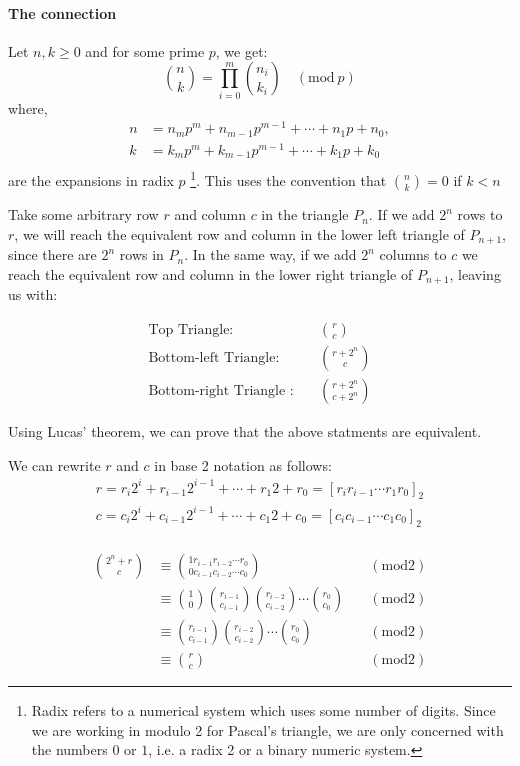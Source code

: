 \documentclass[a4paper,11pt,twoside]{article}
\begin{document}
\paragraph{The connection}
\label{sec:org6facba4}
Let \(n,k \ge 0\) and for some prime \(p\), we get:
\begin{equation}
\binom{n}{k} = \prod_{i=0}^{m} \binom{n_i}{k_i} \quad (\text{mod}~p)
\end{equation}
where,
\begin{align*}
n &= n_{m}p^{m}+n_{m-1}p^{m-1}+\cdots + n_{1}p+n_{0},\\
k &= k_{m}p^{m}+k_{m-1}p^{m-1}+\cdots + k_{1}p+k_{0}\\
\end{align*}
are the expansions in radix \(p\) \footnote{Radix refers to a numerical system which uses some number of digits. Since we are working in modulo 2 for Pascal's triangle, we are only concerned with the numbers \(0\) or \(1\), i.e. a radix 2 or a binary numeric system.}. This uses the convention that \(\binom{n}{k} = 0\) if \(k < n\)

Take some arbitrary row \(r\) and column \(c\) in the triangle \(P_{n}\). If we add \(2^{n}\) rows to \(r\), we will reach the equivalent row and column in the lower left triangle of \(P_{n+1}\), since there are \(2^{n}\) rows in \(P_{n}\). In the same way, if we add \(2^{n}\) columns to \(c\) we reach the equivalent row and column in the lower right triangle of \(P_{n+1}\), leaving us with:

\begin{align*}
\text{Top Triangle:} \quad &\binom{r}{c}  \\
\text{Bottom-left Triangle:}\quad &\binom{r + 2^n}{c}  \\
\text{Bottom-right Triangle :}\quad &\binom{r + 2^n}{c + 2^n} \label{eq:bottom-right}
\end{align*}

Using Lucas' theorem, we can prove that the above statments are equivalent.

We can rewrite \(r\) and \(c\) in base 2 notation as follows:
\begin{align*}
r=r_{i}2^{i}+r_{i-1}2^{i-1}+\cdots + r_{1}2+r_{0}= \left[r_{i}r_{i-1}\cdots r_{1}r_{0}\right]_2\\
c=c_{i}2^{i}+c_{i-1}2^{i-1}+\cdots +c_{1}2+c_{0}=\left[c_{i}c_{i-1}\cdots c_{1}c_{0}\right]_2\\
\end{align*}

\begin{align*}
\binom{2^n + r}{c} &\equiv \binom{1r_{i-1}r_{i-2} \cdots r_{0}}{0c_{i-1}c_{i-2} \cdots c_{0}} \quad &(\text{mod} 2)\\
&\equiv \binom{1}{0}\binom{r_{i-1}}{c_{i-1}}\binom{r_{i-2}}{c_{i-2}} \cdots \binom{r_0}{c_0} \quad &(\text{mod} 2)\\
&\equiv\binom{r_{i-1}}{c_{i-1}}\binom{r_{i-2}}{c_{i-2}} \cdots \binom{r_0}{c_0} \quad &(\text{mod} 2)\\
&\equiv \binom{r}{c} \quad &(\text{mod} 2)
\end{align*}
\end{document}
